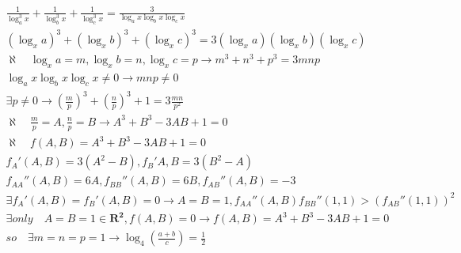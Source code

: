 \documentclass{article}
\begin{document}
\clearpage
\begin{align*}
    \frac{1}{\log_{a}^3x}+\frac{1}{\log_{b}^3x}+\frac{1}{\log_{c}^3x} = \frac{3}{\log_{a}x\log_{b}x\log_{c}x}
    \\ (\log_{x}a)^3+(\log_{x}b)^3+(\log_{x}c)^3 = 3(\log_{x}a)(\log_{x}b)(\log_{x}c)
    \\ \aleph \quad \log_{x}a=m,\log_{x}b=n,\log_{x}c=p \rightarrow m^3+n^3+p^3 = 3mnp
    \\ \log_{a}x\log_{b}x\log_{c}x \neq 0 \longrightarrow mnp \neq 0
    \\ \exists p \neq 0 \rightarrow (\frac{m}{p})^3+(\frac{n}{p})^3+1=3\frac{mn}{p^2}
    \\ \aleph \quad \frac{m}{p}=A,\frac{n}{p} =B \rightarrow A^3+B^3-3AB+1=0
    \\ \aleph \quad f(A,B) = A^3+B^3-3AB+1 = 0 
    \\ f_{A}'(A,B) = 3(A^2-B),f_{B}'{A,B}=3(B^2-A)
    \\ f_{AA}''(A,B)=6A,f_{BB}''(A,B)=6B,f_{AB}''(A,B)=-3
    \\ \exists f_{A}'(A,B)=f_{B}'(A,B) = 0 \longrightarrow A=B=1,f_{AA}''(A,B)f_{BB}''(1,1)>(f_{AB}''(1,1))^2
    \\ \exists only \quad A=B=1 \in \mathbf{R^2},f(A,B)=0 \longrightarrow f(A,B) = A^3+B^3-3AB+1 = 0 
    \\ so \quad \exists m = n = p = 1 \longrightarrow \log_{4}\left(\frac{a+b}{c}\right)=\frac{1}{2} 
\end{align*}

\clearpage
\end{document}
